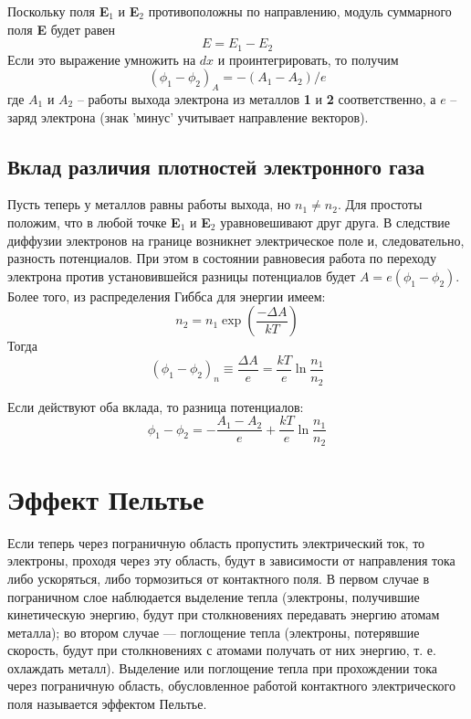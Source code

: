 \documentclass[a4paper, 12pt, openany]{book}
\begin{document}
	Поскольку поля \textbf{E$_1$} и \textbf{E$_2$} противоположны по направлению, модуль суммарного поля \textbf{E} будет равен
	$$E = E_1 - E_2$$ Если это выражение умножить на $dx$ и проинтегрировать, то получим \begin{equation}
	(\phi_1 - \phi_2)_A = -(A_1 - A_2)/e
	\label{eq1}
	\end{equation}
	где $A_1$ и $A_2$ -- работы выхода электрона из металлов \textbf{1} и \textbf{2} соответственно, а $e$ -- заряд электрона (знак 'минус' учитывает направление векторов).
	
	\subsection{Вклад различия плотностей электронного газа}
	Пусть теперь у металлов равны работы выхода, но $n_1 \ne n_2$. Для простоты положим, что в любой точке \textbf{E$_1$} и \textbf{E$_2$} уравновешивают друг друга. В следствие диффузии электронов на границе возникнет электрическое поле и, следовательно, разность потенциалов. При этом в состоянии равновесия работа по переходу электрона против установившейся разницы потенциалов будет $A = e(\phi_1 - \phi_2)$. Более того, из распределения Гиббса для энергии имеем:
	$$ n_2 = n_1 \exp\left(\frac{-\Delta A}{kT}\right)$$
	Тогда
	\begin{equation}
	(\phi_1 - \phi_2)_n \equiv \frac{\Delta A}{e} = \frac{kT}{e} \ln\frac{n_1}{n_2}
	\label{eq2}
	\end{equation}
	
	Если действуют оба вклада, то разница потенциалов:
	\begin{equation}
	\phi_1 - \phi_2 = - \frac{A_1 - A_2}{e} + \frac{kT}{e} \ln\frac{n_1}{n_2}
	\label{finEq}
	\end{equation}
	
	\section{Эффект Пельтье}
	Если теперь через пограничную область пропустить электрический ток, то электроны, проходя через эту область, будут в зависимости от направления тока либо ускоряться, либо тормозиться от контактного поля. В первом случае в пограничном слое наблюдается выделение тепла (электроны, получившие кинетическую энергию, будут при столкновениях передавать энергию атомам металла); во втором случае — поглощение тепла (электроны, потерявшие скорость, будут
	при столкновениях с атомами получать от них энергию, т. е. охлаждать металл). Выделение или поглощение тепла при прохождении тока через пограничную область, обусловленное работой контактного электрического поля называется эффектом Пельтье.
	
\end{document}

